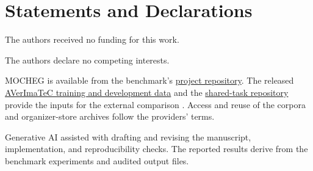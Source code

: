 \section*{Statements and Declarations}

The authors received no funding for this work.

The authors declare no competing interests.

MOCHEG \cite{yao2023mocheg} is available from the benchmark's
\href{https://github.com/PLUM-Lab/Mocheg}{project repository}.
The released \href{https://huggingface.co/datasets/Rui4416/AVerImaTeC}{AVerImaTeC
training and development data} and the \href{https://github.com/abril4416/AVerImaTec_Shared_Task}{shared-task repository}
provide the inputs for the external comparison \cite{cao2026averimatecshared}.
Access and reuse of the corpora and organizer-store archives follow the
providers' terms.


Generative AI assisted with drafting and revising the manuscript, implementation,
and reproducibility checks. The reported results derive from the benchmark
experiments and audited output files.
